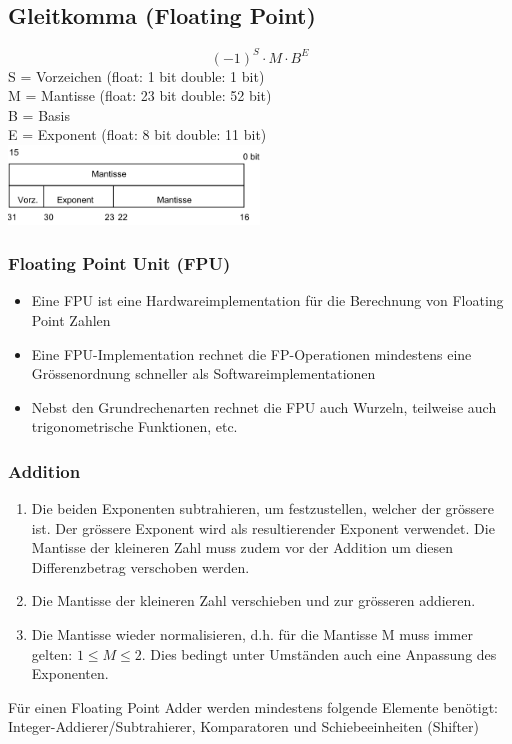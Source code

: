 \subsection{Gleitkomma (Floating Point)}
\begin{multicols}{2}
	\begin{equation}
	(-1)^S\cdot M \cdot B^E
	\end{equation}
	S = Vorzeichen (float: 1 bit double: 1 bit)\\
	M = Mantisse (float: 23 bit double: 52 bit)\\
	B = Basis \\
	E = Exponent (float: 8 bit double: 11 bit)\\
\columnbreak
	\includegraphics[width=0.5\textwidth]{images/Arithmetik/floating_point}
\end{multicols}

\subsubsection{Floating Point Unit (FPU)}
\begin{itemize}
	\item Eine FPU ist eine Hardwareimplementation für die Berechnung von Floating Point Zahlen
	\item Eine FPU-Implementation rechnet die FP-Operationen mindestens eine Grössenordnung schneller als Softwareimplementationen
	\item Nebst den Grundrechenarten rechnet die FPU auch Wurzeln, teilweise auch trigonometrische Funktionen, etc.
\end{itemize}

\subsubsection{Addition}
\begin{enumerate}
	\item Die beiden Exponenten subtrahieren, um festzustellen, welcher der grössere ist. Der grössere Exponent wird als resultierender Exponent verwendet. Die Mantisse der kleineren Zahl muss zudem vor der Addition um diesen Differenzbetrag verschoben werden.
	\item Die Mantisse der kleineren Zahl verschieben und zur grösseren addieren.
	\item Die Mantisse wieder normalisieren, d.h. für die Mantisse M muss immer gelten: $1 \leq M \leq 2$. Dies bedingt unter Umständen auch eine Anpassung des Exponenten.
\end{enumerate}
Für einen Floating Point Adder werden mindestens folgende Elemente benötigt: Integer-Addierer/Subtrahierer, Komparatoren und Schiebeeinheiten (Shifter)


